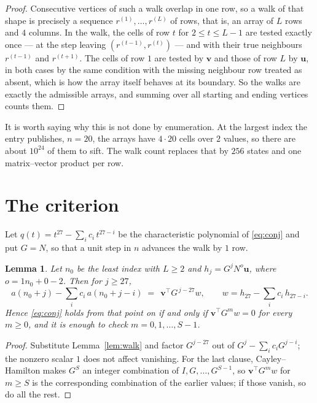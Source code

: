 \documentclass[11pt,a4paper]{article}
\theoremstyle{plain}
\newtheorem{lemma}[theorem]{Lemma}
\theoremstyle{definition}
\begin{document}
\begin{proof}
Consecutive vertices of such a walk overlap in one row, so a walk of that shape is
precisely a sequence $r^{(1)},\dots,r^{(L)}$ of rows, that is, an array of $L$ rows
and $4$ columns. In the walk, the cells of row $t$ for $2\le t\le L-1$ are tested
exactly once --- at the step leaving $(r^{(t-1)},r^{(t)})$ --- and with their true
neighbours $r^{(t-1)}$ and $r^{(t+1)}$. The cells of row $1$ are tested by
$\mathbf{v}$ and those of row $L$ by $\mathbf{u}$, in both cases by the same condition
with the missing neighbour row treated as absent, which is how the array itself behaves at
its boundary. So the walks are exactly the admissible arrays, and summing over all starting
and ending vertices counts them.
\end{proof}


It is worth saying why this is not done by enumeration. At the largest index the entry
publishes, $n=20$, the arrays have $4\cdot20$ cells over
$2$ values, so there are about $10^{24}$ of them to sift. The
walk count replaces that by $256$ states and one matrix--vector product per row.
\section{The criterion}

Let $q(t)=t^{27}-\sum_i c_i\,t^{27-i}$ be the characteristic polynomial of
\eqref{eq:conj} and put $G=N$, so that a unit step in $n$ advances the walk by
$1$ row.

\begin{lemma}\label{lem:crit}
Let $n_0$ be the least index with $L\ge2$ and $h_j=G^{j}N^{o}\mathbf{u}$, where
$o=1n_0+0-2$. Then for $j\ge27$,
\[
a(n_0+j)-\sum_i c_i\,a(n_0+j-i)\;=\;\,\mathbf{v}^{\!\top}G^{\,j-27}w,
\qquad w=h_{27}-\sum_i c_i\,h_{27-i} .
\]
Hence \eqref{eq:conj} holds from that point on if and only if
$\mathbf{v}^{\!\top}G^{m}w=0$ for every $m\ge0$, and it is enough to check
$m=0,1,\dots,S-1$.
\end{lemma}

\begin{proof}
Substitute Lemma~\ref{lem:walk} and factor $G^{j-27}$ out of
$G^{j}-\sum_ic_iG^{j-i}$; the nonzero scalar $1$ does not affect
vanishing. For the last clause, Cayley--Hamilton makes $G^{S}$ an integer combination of
$I,G,\dots,G^{S-1}$, so $\mathbf{v}^{\!\top}G^{m}w$ for $m\ge S$ is the corresponding
combination of the earlier values; if those vanish, so do all the rest.
\end{proof}
\end{document}
